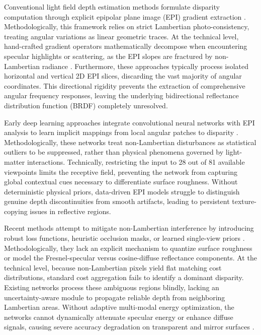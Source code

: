 \documentclass[lettersize,journal]{IEEEtran}
\begin{document}
Conventional light field depth estimation methods formulate disparity computation through explicit epipolar plane image (EPI) gradient extraction \cite{wanner2014, wang2015}. Methodologically, this framework relies on strict Lambertian photo-consistency, treating angular variations as linear geometric traces. At the technical level, hand-crafted gradient operators mathematically decompose when encountering specular highlights or scattering, as the EPI slopes are fractured by non-Lambertian radiance \cite{tao2013}. Furthermore, these approaches typically process isolated horizontal and vertical 2D EPI slices, discarding the vast majority of angular coordinates. This directional rigidity prevents the extraction of comprehensive angular frequency responses, leaving the underlying bidirectional reflectance distribution function (BRDF) completely unresolved.

Early deep learning approaches integrate convolutional neural networks with EPI analysis to learn implicit mappings from local angular patches to disparity \cite{heber2018, lyu2022}. Methodologically, these networks treat non-Lambertian disturbances as statistical outliers to be suppressed, rather than physical phenomena governed by light-matter interactions. Technically, restricting the input to 28 out of 81 available viewpoints limits the receptive field, preventing the network from capturing global contextual cues necessary to differentiate surface roughness. Without deterministic physical priors, data-driven EPI models struggle to distinguish genuine depth discontinuities from smooth artifacts, leading to persistent texture-copying issues in reflective regions.

Recent methods attempt to mitigate non-Lambertian interference by introducing robust loss functions, heuristic occlusion masks, or learned single-view priors \cite{li2021, zhang2023}. Methodologically, they lack an explicit mechanism to quantize surface roughness or model the Fresnel-specular versus cosine-diffuse reflectance components. At the technical level, because non-Lambertian pixels yield flat matching cost distributions, standard cost aggregation fails to identify a dominant disparity. Existing networks process these ambiguous regions blindly, lacking an uncertainty-aware module to propagate reliable depth from neighboring Lambertian areas. Without adaptive multi-modal energy optimization, the networks cannot dynamically attenuate specular energy or enhance diffuse signals, causing severe accuracy degradation on transparent and mirror surfaces \cite{wang2023}.
\end{document}
